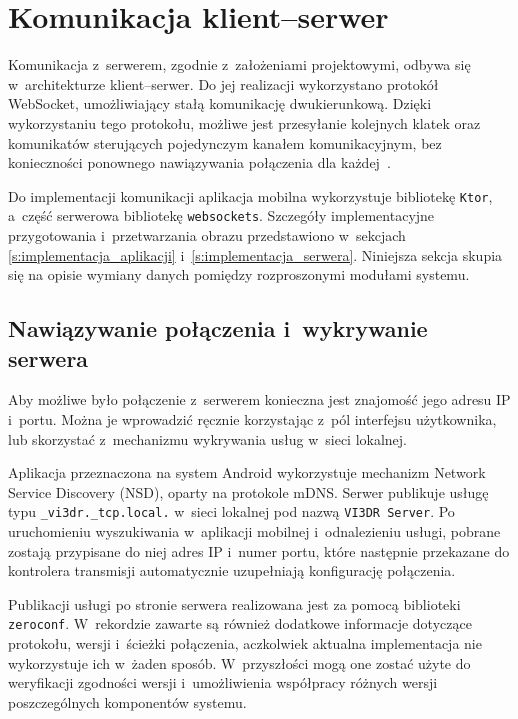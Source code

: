 \section{Komunikacja klient--serwer}
\label{s:komunikacja}

Komunikacja z~serwerem, zgodnie z~założeniami projektowymi, odbywa się w~architekturze klient--serwer. Do jej realizacji wykorzystano protokół WebSocket, umożliwiający stałą komunikację dwukierunkową. Dzięki wykorzystaniu tego protokołu, możliwe jest przesyłanie kolejnych klatek oraz komunikatów sterujących pojedynczym kanałem komunikacyjnym, bez konieczności ponownego nawiązywania połączenia dla każdej~.

Do implementacji komunikacji aplikacja mobilna wykorzystuje bibliotekę \texttt{Ktor}, a~część serwerowa bibliotekę \texttt{websockets}. Szczegóły implementacyjne przygotowania i~przetwarzania obrazu przedstawiono w~sekcjach \ref{s:implementacja_aplikacji} i~\ref{s:implementacja_serwera}. Niniejsza sekcja skupia się na opisie wymiany danych pomiędzy rozproszonymi modułami systemu.

\subsection{Nawiązywanie połączenia i~wykrywanie serwera}

Aby możliwe było połączenie z~serwerem konieczna jest znajomość jego adresu IP i~portu. Można je wprowadzić ręcznie korzystając z~pól interfejsu użytkownika, lub skorzystać z~mechanizmu wykrywania usług w~sieci lokalnej.

Aplikacja przeznaczona na system Android wykorzystuje mechanizm Network Service Discovery (NSD), oparty na protokole mDNS. Serwer publikuje usługę typu \texttt{\_vi3dr.\_tcp.local.} w~sieci lokalnej pod nazwą \texttt{VI3DR Server}. Po uruchomieniu wyszukiwania w~aplikacji mobilnej i~odnalezieniu usługi, pobrane zostają przypisane do niej adres IP i~numer portu, które następnie przekazane do kontrolera transmisji automatycznie uzupełniają konfigurację połączenia.

Publikacji usługi po stronie serwera realizowana jest za pomocą biblioteki \texttt{zeroconf}. W~rekordzie zawarte są również dodatkowe informacje dotyczące protokołu, wersji i~ścieżki połączenia, aczkolwiek aktualna implementacja nie wykorzystuje ich w~żaden sposób. W~przyszłości mogą one zostać użyte do weryfikacji zgodności wersji i~umożliwienia współpracy różnych wersji poszczególnych komponentów systemu.

